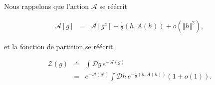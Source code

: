 


Nous rappelons que l'action $\mathcal{A}$ se réécrit  

\begin{eqnarray}
	\mathcal{A}[g]  & = & \mathcal{A}[g^c]    + \frac{1}{2}  (h , A(h)) + o (\Vert h \Vert^2 ) ,
\end{eqnarray}




et la fonction de partition se réécrit 

\begin{eqnarray}
	\mathcal{Z}(g) & \doteq & \int \mathcal{D}g \,  e^{-\mathcal{A}(g)} \\
	& = &  e^{-\mathcal{A}(g^c)} \int \mathcal{D}h\,  e^{-\frac{1}{2}(h,A(h))}(1 + o (1)).
\end{eqnarray}



